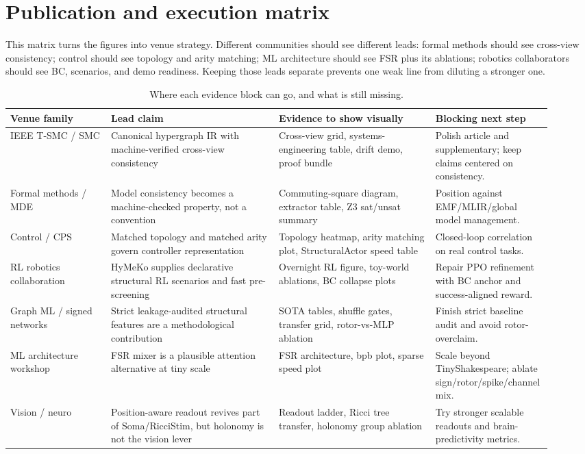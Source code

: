 \documentclass[10pt]{article}
\begin{document}
\section{Publication and execution matrix}

This matrix turns the figures into venue strategy. Different communities should
see different leads: formal methods should see cross-view consistency; control
should see topology and arity matching; ML architecture should see FSR plus its
ablations; robotics collaborators should see BC, scenarios, and demo readiness.
Keeping those leads separate prevents one weak line from diluting a stronger
one.

\begin{table}[!htbp]\centering\scriptsize
\begin{tabular}{p{0.18\linewidth}p{0.30\linewidth}p{0.28\linewidth}p{0.16\linewidth}}
\toprule
Venue family & Lead claim & Evidence to show visually & Blocking next step \\
\midrule
IEEE T-SMC / SMC & Canonical hypergraph IR with machine-verified cross-view
consistency & Cross-view grid, systems-engineering table, drift demo, proof
bundle & Polish article and supplementary; keep claims centered on consistency. \\
Formal methods / MDE & Model consistency becomes a machine-checked property,
not a convention & Commuting-square diagram, extractor table, Z3 sat/unsat
summary & Position against EMF/MLIR/global model management. \\
Control / CPS & Matched topology and matched arity govern controller
representation & Topology heatmap, arity matching plot, StructuralActor speed
table & Closed-loop correlation on real control tasks. \\
RL robotics collaboration & HyMeKo supplies declarative structural RL scenarios
and fast pre-screening & Overnight RL figure, toy-world ablations, BC collapse
plots & Repair PPO refinement with BC anchor and success-aligned reward. \\
Graph ML / signed networks & Strict leakage-audited structural features are a
methodological contribution & SOTA tables, shuffle gates, transfer grid,
rotor-vs-MLP ablation & Finish strict baseline audit and avoid rotor-overclaim. \\
ML architecture workshop & FSR mixer is a plausible attention alternative at
tiny scale & FSR architecture, bpb plot, sparse speed plot & Scale beyond
TinyShakespeare; ablate sign/rotor/spike/channel mix. \\
Vision / neuro & Position-aware readout revives part of Soma/RicciStim, but
holonomy is not the vision lever & Readout ladder, Ricci tree transfer, holonomy
group ablation & Try stronger scalable readouts and brain-predictivity metrics. \\
\bottomrule
\end{tabular}
\caption{Where each evidence block can go, and what is still missing.}
\end{table}
\end{document}
